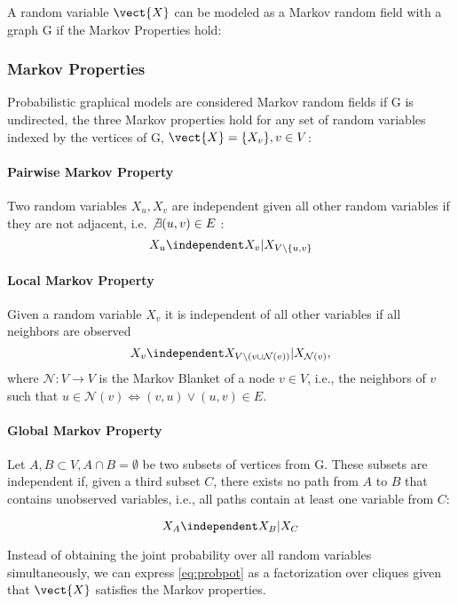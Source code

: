 A random variable $\vect{X}$ can be modeled as a Markov random field with a graph G if the Markov Properties hold:

\subsubsection*{Markov Properties}
Probabilistic graphical models are considered Markov random fields if G is undirected, the three Markov properties hold for any set of random variables indexed by the vertices of G, $\vect{X} = \{X_v\}, v \in V$:

\paragraph*{Pairwise Markov Property}
Two random variables $X_u, X_v$ are independent given all other random variables if they are not adjacent, i.e. $\not\exists (u,v) \in E$ :
\begin{equation}
    X_u \independent X_v \lvert X_{V \setminus\{u,v\}}
\end{equation}

\paragraph*{Local Markov Property}
Given a random variable $X_v$ it is independent of all other variables if all neighbors are observed 
\begin{equation}
    X_v \independent X_{V\setminus (v \cup \mathcal{N}(v))} \lvert X_{\mathcal{N}(v)},   
\end{equation}
where $\mathcal{N}: V \rightarrow V$ is the Markov Blanket of a node $v \in V$, i.e., the neighbors of $v$ such that $u \in \mathcal{N}(v) \Leftrightarrow (v,u) \vee (u,v) \in E$.

\paragraph*{Global Markov Property}
Let $A, B \subset V, A \cap B = \emptyset$ be two subsets of vertices from G. 
These subsets are independent if, given a third subset $C$, there exists no path from $A$ to $B$ that contains unobserved variables, i.e., all paths contain at least one variable from $C$:

\begin{equation}
    X_A \independent X_B \lvert X_C
\end{equation}

Instead of obtaining the joint probability over all random variables simultaneously, we can express \autoref{eq:probpot} as a factorization over cliques given that $\vect{X}$ satisfies the Markov properties. 


